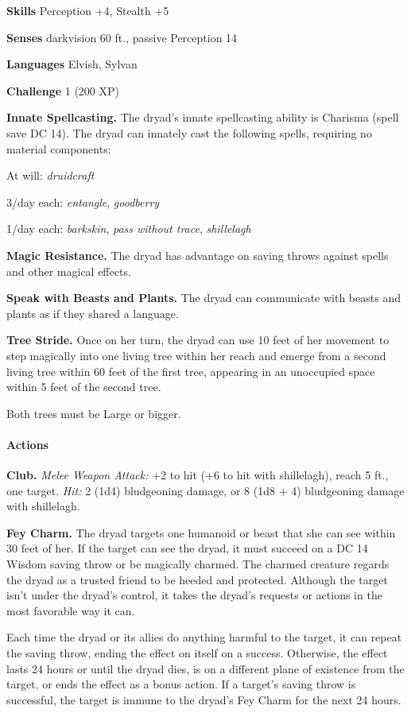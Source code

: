 \documentclass[
]{article}
\begin{document}
\textbf{Skills} Perception +4, Stealth +5

\textbf{Senses} darkvision 60 ft., passive Perception 14

\textbf{Languages} Elvish, Sylvan

\textbf{Challenge} 1 (200 XP)

\textbf{Innate Spellcasting.} The dryad's innate spellcasting ability is
Charisma (spell save DC 14). The dryad can innately cast the following
spells, requiring no material components:

At will: \emph{druidcraft}

3/day each: \emph{entangle}, \emph{goodberry}

1/day each: \emph{barkskin}, \emph{pass without trace},
\emph{shillelagh}

\textbf{Magic Resistance.} The dryad has advantage on saving throws
against spells and other magical effects.

\textbf{Speak with Beasts and Plants.} The dryad can communicate with
beasts and plants as if they shared a language.

\textbf{Tree Stride.} Once on her turn, the dryad can use 10 feet of her
movement to step magically into one living tree within her reach and
emerge from a second living tree within 60 feet of the first tree,
appearing in an unoccupied space within 5 feet of the second tree.

Both trees must be Large or bigger.

\hypertarget{actions-65}{%
\paragraph{Actions}\label{actions-65}}

\textbf{Club.} \emph{Melee Weapon Attack:} +2 to hit (+6 to hit with
shillelagh), reach 5 ft., one target. \emph{Hit:} 2 (1d4) bludgeoning
damage, or 8 (1d8 + 4) bludgeoning damage with shillelagh.

\textbf{Fey \textbf{Charm.}} The dryad targets one humanoid or beast
that she can see within 30 feet of her. If the target can see the dryad,
it must succeed on a DC 14 Wisdom saving throw or be magically charmed.
The charmed creature regards the dryad as a trusted friend to be heeded
and protected. Although the target isn't under the dryad's control, it
takes the dryad's requests or actions in the most favorable way it can.

Each time the dryad or its allies do anything harmful to the target, it
can repeat the saving throw, ending the effect on itself on a success.
Otherwise, the effect lasts 24 hours or until the dryad dies, is on a
different plane of existence from the target, or ends the effect as a
bonus action. If a target's saving throw is successful, the target is
immune to the dryad's Fey Charm for the next 24 hours.
\end{document}

